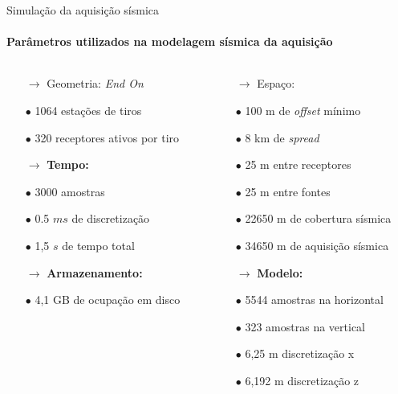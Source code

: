 \documentclass[xcolor=dvipsnames,t]{beamer}
\begin{document}
\begin{frame}{Simulação da aquisição sísmica}
\framesubtitle{Parâmetros utilizados na modelagem sísmica da aquisição}	

\pause
\begin{columns}[onlytextwidth, T]
	\begin{column}{.5\textwidth}
		\begin{itemize}
			\small
			\item[$\to$] Geometria: \textit{End On}
			\item[$\bullet$] 1064 estações de tiros
			\item[$\bullet$] 320 receptores ativos por tiro
		\end{itemize}
		
		\bigskip	
		\begin{itemize}
			\small
			\item[$\to$] \textbf{Tempo:}
			\item[$\bullet$] 3000 amostras
			\item[$\bullet$] 0.5 $ms$ de discretização
			\item[$\bullet$] 1,5 $s$ de tempo total
		\end{itemize}
		
		\bigskip
		\begin{itemize}
			\small
			\item[$\to$] \textbf{Armazenamento:}
			\item[$\bullet$] 4,1 GB de ocupação em disco
		\end{itemize}		
	\end{column}
	
	\begin{column}{.5\textwidth}
		\begin{itemize}
			\small
			\item[$\to$] Espaço:
			\item[$\bullet$] 100 m de \textit{offset} mínimo
			\item[$\bullet$] 8 km de \textit{spread}		
			\item[$\bullet$] 25 m entre receptores
			\item[$\bullet$] 25 m entre fontes
			\item[$\bullet$] 22650 m de cobertura sísmica
			\item[$\bullet$] 34650 m de aquisição sísmica
		\end{itemize}		
		
		\bigskip
		\begin{itemize}
			\small
			\item[$\to$] \textbf{Modelo:}
			\item[$\bullet$] 5544 amostras na horizontal
			\item[$\bullet$] 323 amostras na vertical
			\item[$\bullet$] 6,25 m discretização x 
			\item[$\bullet$] 6,192 m discretização z			
		\end{itemize}
	\end{column}
\end{columns}

\end{frame}
\end{document}
